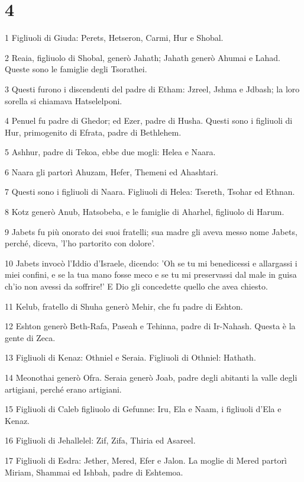 \chapter{4}

\par 1 Figliuoli di Giuda: Perets, Hetseron, Carmi, Hur e Shobal.
\par 2 Reaia, figliuolo di Shobal, generò Jahath; Jahath generò Ahumai e Lahad. Queste sono le famiglie degli Tsorathei.
\par 3 Questi furono i discendenti del padre di Etham: Jzreel, Jshma e Jdbash; la loro sorella si chiamava Hatselelponi.
\par 4 Penuel fu padre di Ghedor; ed Ezer, padre di Husha. Questi sono i figliuoli di Hur, primogenito di Efrata, padre di Bethlehem.
\par 5 Ashhur, padre di Tekoa, ebbe due mogli: Helea e Naara.
\par 6 Naara gli partorì Ahuzam, Hefer, Themeni ed Ahashtari.
\par 7 Questi sono i figliuoli di Naara. Figliuoli di Helea: Tsereth, Tsohar ed Ethnan.
\par 8 Kotz generò Anub, Hatsobeba, e le famiglie di Aharhel, figliuolo di Harum.
\par 9 Jabets fu più onorato dei suoi fratelli; sua madre gli aveva messo nome Jabets, perché, diceva, 'l'ho partorito con dolore'.
\par 10 Jabets invocò l'Iddio d'Israele, dicendo: 'Oh se tu mi benedicessi e allargassi i miei confini, e se la tua mano fosse meco e se tu mi preservassi dal male in guisa ch'io non avessi da soffrire!' E Dio gli concedette quello che avea chiesto.
\par 11 Kelub, fratello di Shuha generò Mehir, che fu padre di Eshton.
\par 12 Eshton generò Beth-Rafa, Paseah e Tehinna, padre di Ir-Nahash. Questa è la gente di Zeca.
\par 13 Figliuoli di Kenaz: Othniel e Seraia. Figliuoli di Othniel: Hathath.
\par 14 Meonothai generò Ofra. Seraia generò Joab, padre degli abitanti la valle degli artigiani, perché erano artigiani.
\par 15 Figliuoli di Caleb figliuolo di Gefunne: Iru, Ela e Naam, i figliuoli d'Ela e Kenaz.
\par 16 Figliuoli di Jehallelel: Zif, Zifa, Thiria ed Asareel.
\par 17 Figliuoli di Esdra: Jether, Mered, Efer e Jalon. La moglie di Mered partorì Miriam, Shammai ed Ishbah, padre di Eshtemoa.
